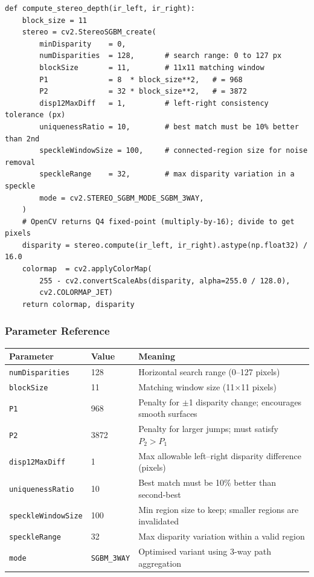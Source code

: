 \documentclass[12pt, a4paper]{article}
\newcommand{\code}[1]{\texttt{\small#1}}
\begin{document}
\begin{lstlisting}[caption={SGBM stereo matching (live\_stream.py lines 124--143)}]
def compute_stereo_depth(ir_left, ir_right):
    block_size = 11
    stereo = cv2.StereoSGBM_create(
        minDisparity    = 0,
        numDisparities  = 128,       # search range: 0 to 127 px
        blockSize       = 11,        # 11x11 matching window
        P1              = 8  * block_size**2,   # = 968
        P2              = 32 * block_size**2,   # = 3872
        disp12MaxDiff   = 1,         # left-right consistency tolerance (px)
        uniquenessRatio = 10,        # best match must be 10% better than 2nd
        speckleWindowSize = 100,     # connected-region size for noise removal
        speckleRange    = 32,        # max disparity variation in a speckle
        mode = cv2.STEREO_SGBM_MODE_SGBM_3WAY,
    )
    # OpenCV returns Q4 fixed-point (multiply-by-16); divide to get pixels
    disparity = stereo.compute(ir_left, ir_right).astype(np.float32) / 16.0
    colormap  = cv2.applyColorMap(
        255 - cv2.convertScaleAbs(disparity, alpha=255.0 / 128.0),
        cv2.COLORMAP_JET)
    return colormap, disparity
\end{lstlisting}

\subsubsection{Parameter Reference}

\begin{center}
\begin{tabularx}{\linewidth}{llX}
  \toprule
  \textbf{Parameter} & \textbf{Value} & \textbf{Meaning} \\
  \midrule
  \code{numDisparities} & 128 & Horizontal search range (0--127 pixels) \\
  \code{blockSize}      & 11  & Matching window size (11$\times$11 pixels) \\
  \code{P1}             & 968 & Penalty for $\pm$1 disparity change; encourages smooth surfaces \\
  \code{P2}             & 3872 & Penalty for larger jumps; must satisfy $P_2 > P_1$ \\
  \code{disp12MaxDiff}  & 1   & Max allowable left--right disparity difference (pixels) \\
  \code{uniquenessRatio}& 10  & Best match must be 10\% better than second-best \\
  \code{speckleWindowSize}& 100 & Min region size to keep; smaller regions are invalidated \\
  \code{speckleRange}   & 32  & Max disparity variation within a valid region \\
  \code{mode}           & \code{SGBM\_3WAY} & Optimised variant using 3-way path aggregation \\
  \bottomrule
\end{tabularx}
\end{center}
\end{document}
